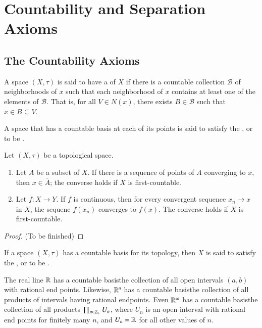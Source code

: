 \documentclass[12pt, a4paper, oneside, openright, titlepage]{book}
\begin{document}
\chapter{ Countability and Separation Axioms}


\section{The Countability Axioms}

\begin{definition}
    A space $(X,\tau)$ is said to have a  of $X$ if there is a countable collection $\mathcal{B}$ of neighborhoods of $x$ such that each neighborhood of $x$ contains at least one of the elements of $\mathcal{B}$. That is, for all $V \in N(x)$, there exists $B \in \mathcal{B}$ such that $x \in B \subseteq V$.


    A space that has a countable basis at each of its points is said to satisfy the , or to be .
\end{definition}

\begin{theorem}
    Let $(X,\tau)$ be a topological space. \begin{enumerate}
        \item Let $A$ be a subset of $X$. If there is a sequence of points of $A$ converging to $x$, then $x \in \overline{A}$; the converse holds if $X$ is first-countable.
        \item Let $f:X\rightarrow Y$. If $f$ is continuous, then for every convergent sequence $x_n\rightarrow x$ in $X$, the sequenc $f(x_n)$ converges to $f(x)$. The converse holds if $X$ is first-countable.
    \end{enumerate}
\end{theorem}
\begin{proof}
    (To be finished)
\end{proof}


\begin{definition}
    If a space $(X,\tau)$ has a countable basis for its topology, then $X$ is said to satisfy the , or to be .
\end{definition}

\begin{example}
    The real line $\mathbb R$ has a countable basis\textendash the collection of all open intervals $(a,b)$ with rational end points. Likewise, $\mathbb R^n$ has a countable basis\textendash the collection of all products of intervals having rational endpoints. Even $\mathbb R^{\omega}$ has a countable basis\textendash the collection of all products $\prod_{n\in\mathbb Z_+}U_n$, where $U_n$ is an open interval with rational end points for finitely many $n$, and $U_n = \mathbb R$ for all other values of $n$.
\end{example}
\end{document}
